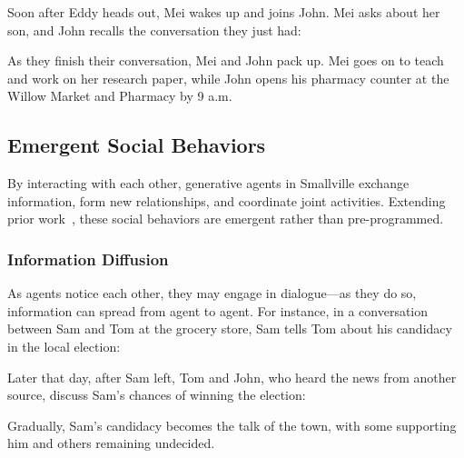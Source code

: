 \begin{quote}

\end{quote}

Soon after Eddy heads out, Mei wakes up and joins John. Mei asks about her son, and John recalls the conversation they just had:

\begin{quote}

\end{quote}

As they finish their conversation, Mei and John pack up. Mei goes on to teach and work on her research paper, while John opens his pharmacy counter at the Willow Market and Pharmacy by 9 a.m. 

\subsection{Emergent Social Behaviors} By interacting with each other, generative agents in Smallville exchange information, form new relationships, and coordinate joint activities. Extending prior work~\cite{9_park2022socialsimulacra}, these social behaviors are emergent rather than pre-programmed. 

\subsubsection{Information Diffusion} As agents notice each other, they may engage in dialogue---as they do so, information can spread from agent to agent. For instance, in a conversation between Sam and Tom at the grocery store, Sam tells Tom about his candidacy in the local election:

\begin{quote}

\end{quote}

Later that day, after Sam left, Tom and John, who heard the news from another source, discuss Sam's chances of winning the election:

\begin{quote}

\end{quote}

Gradually, Sam's candidacy becomes the talk of the town, with some supporting him and others remaining undecided. 

